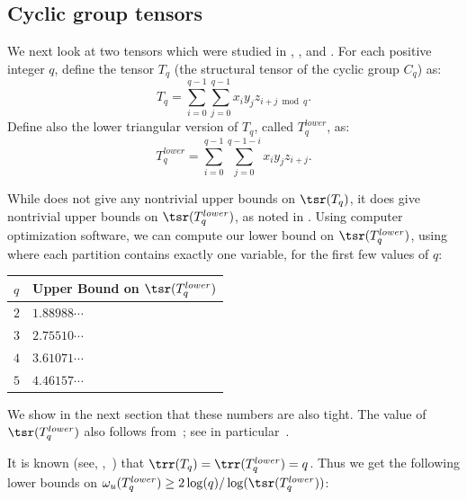 \documentclass{toc}
\begin{document}
%
\subsection{Cyclic group tensors}

We next look at two tensors which were studied in \cite{cohn2003group}, \cite{almanitcs}, and \cite[Section~7.3]{aw}. For each positive integer $q$, define the tensor $T_q$ (the structural tensor of the cyclic group $C_q$) as:
$$T_q=\sum_{i=0}^{q-1}\sum_{j=0}^{q-1} x_i y_j z_{i+j\bmod q}.$$
Define also the lower triangular version of $T_q$, called $T_q^{lower}$, as:
$$T_q^{lower}=\sum_{i=0}^{q-1}\sum_{j=0}^{q-1-i} x_i y_j z_{i+j}.$$

 While  does not give any nontrivial upper bounds on $\tsr(T_q)$, it does give nontrivial upper bounds on $\tsr(T_q^{lower})$, as noted in \cite[Section~7.3]{aw}. Using computer optimization software, we can compute our lower bound on $\tsr(T_q^{lower})$, using  where each partition contains exactly one variable, for the first few values of $q$:

\begin{center}
\begin{tabular}{l|l}
$q$ & Upper Bound on $\tsr(T_q^{lower})$ \\ \hline
$2$                                & $1.88988\cdots$                                                        \\
$3$                                & $2.75510\cdots$                                                        \\
$4$                                & $3.61071\cdots$                                                        \\
$5$                                & $4.46157\cdots$                                                     
\end{tabular}
\end{center}


We show in the next section that these numbers are also tight. The value of $\tsr(T_q^{lower})$ also follows from~\cite{strassen1991degeneration}; see in particular~\cite[{Table~1}]{strassen1991degeneration}.

It is known (see, \eg,~\cite{almanitcs}) that $\trr(T_q) = \trr(T_q^{lower}) = q$. Thus we get the following lower bounds on $\omega_u(T_q^{lower}) \geq 2 \log(q) / \log(\tsr(T_q^{lower}))$:
\end{document}
